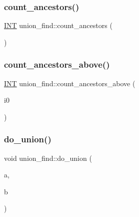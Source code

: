 \mbox{\label{classunion__find_ad98f42a8846fb89237b9c27e594ec2ee}} 
\subsubsection{\texorpdfstring{count\+\_\+ancestors()}{count\_ancestors()}}
{\footnotesize\ttfamily \mbox{\hyperlink{galois_8h_a09fddde158a3a20bd2dcadb609de11dc}{I\+NT}} union\+\_\+find\+::count\+\_\+ancestors (\begin{DoxyParamCaption}{ }\end{DoxyParamCaption})}

\mbox{\label{classunion__find_a5f30bf72e328168c13e4e68f7c2d4483}} 
\subsubsection{\texorpdfstring{count\+\_\+ancestors\+\_\+above()}{count\_ancestors\_above()}}
{\footnotesize\ttfamily \mbox{\hyperlink{galois_8h_a09fddde158a3a20bd2dcadb609de11dc}{I\+NT}} union\+\_\+find\+::count\+\_\+ancestors\+\_\+above (\begin{DoxyParamCaption}\item[{\mbox{\hyperlink{galois_8h_a09fddde158a3a20bd2dcadb609de11dc}{I\+NT}}}]{i0 }\end{DoxyParamCaption})}

\mbox{\label{classunion__find_a7c57b5cf10387d978dc5c46c0e5f5f91}} 
\subsubsection{\texorpdfstring{do\+\_\+union()}{do\_union()}}
{\footnotesize\ttfamily void union\+\_\+find\+::do\+\_\+union (\begin{DoxyParamCaption}\item[{\mbox{\hyperlink{galois_8h_a09fddde158a3a20bd2dcadb609de11dc}{I\+NT}}}]{a,  }\item[{\mbox{\hyperlink{galois_8h_a09fddde158a3a20bd2dcadb609de11dc}{I\+NT}}}]{b }\end{DoxyParamCaption})}

